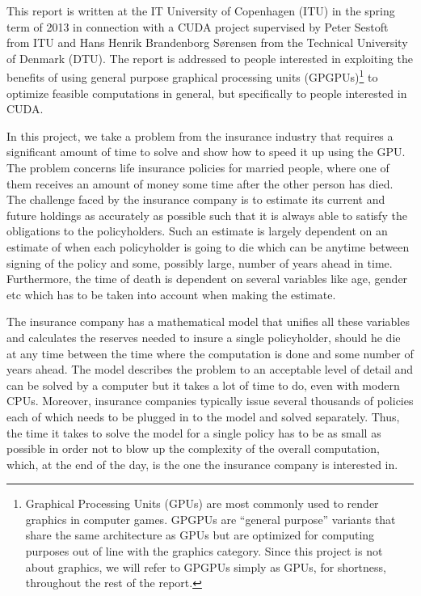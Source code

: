 This report is written at the IT University of Copenhagen (ITU) in the spring term of 2013 in connection with a CUDA project supervised by Peter Sestoft from ITU and Hans Henrik Brandenborg Sørensen from the Technical University of Denmark (DTU). The report is addressed to people interested in exploiting the benefits of using general purpose graphical processing units (GPGPUs)\footnote{Graphical Processing Units (GPUs) are most commonly used to render graphics in computer games. GPGPUs are ``general purpose'' variants that share the same architecture as GPUs but are optimized for computing purposes out of line with the graphics category. Since this project is not about graphics, we will refer to GPGPUs simply as GPUs, for shortness, throughout the rest of the report.} to optimize feasible computations in general, but specifically to people interested in CUDA.

In this project, we take a problem from the insurance industry that requires a significant amount of time to solve and show how to speed it up using the GPU. The problem concerns life insurance policies for married people, where one of them receives an amount of money some time after the other person has died. The challenge faced by the insurance company is to estimate its current and future holdings as accurately as possible such that it is always able to satisfy the obligations to the policyholders. Such an estimate is largely dependent on an estimate of when each policyholder is going to die which can be anytime between signing of the policy and some, possibly large, number of years ahead in time. Furthermore, the time of death is dependent on several variables like age, gender etc which has to be taken into account when making the estimate.

The insurance company has a mathematical model that unifies all these variables and calculates the reserves needed to insure a single policyholder, should he die at any time between the time where the computation is done and some number of years ahead. The model describes the problem to an acceptable level of detail and can be solved by a computer but it takes a lot of time to do, even with modern CPUs. Moreover, insurance companies typically issue several thousands of policies each of which needs to be plugged in to the model and solved separately. Thus, the time it takes to solve the model for a single policy has to be as small as possible in order not to blow up the complexity of the overall computation, which, at the end of the day, is the one the insurance company is interested in. 

